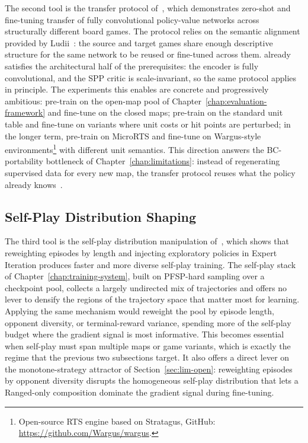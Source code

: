 The second tool is the transfer protocol of~\cite{mellaGeneralTransferApproach}, which demonstrates zero-shot and fine-tuning transfer of fully convolutional policy-value networks across structurally different board games. The protocol relies on the semantic alignment provided by Ludii~\cite{pietteericLudiiLudemicGeneral2020}: the source and target games share enough descriptive structure for the same network to be reused or fine-tuned across them.  already satisfies the architectural half of the prerequisites: the encoder is fully convolutional, and the SPP critic is scale-invariant, so the same protocol applies in principle. The experiments this enables are concrete and progressively ambitious: pre-train on the open-map pool of Chapter~\ref{chap:evaluation-framework} and fine-tune on the closed maps; pre-train on the standard unit table and fine-tune on variants where unit costs or hit points are perturbed; in the longer term, pre-train on MicroRTS and fine-tune on Wargus-style environments\footnote{Open-source RTS engine based on Stratagus, GitHub: \url{https://github.com/Wargus/wargus}.} with different unit semantics. This direction answers the BC-portability bottleneck of Chapter~\ref{chap:limitations}: instead of regenerating supervised data for every new map, the transfer protocol reuses what the policy already knows~\cite{zhuangComprehensiveSurveyTransfer2019}.

\subsection{Self-Play Distribution Shaping}

The third tool is the self-play distribution manipulation of~\cite{soemersManipulatingDistributionsExperience2020}, which shows that reweighting episodes by length and injecting exploratory policies in Expert Iteration produces faster and more diverse self-play training. The self-play stack of Chapter~\ref{chap:training-system}, built on PFSP-hard sampling over a checkpoint pool, collects a largely undirected mix of trajectories and offers no lever to densify the regions of the trajectory space that matter most for learning. Applying the same mechanism would reweight the pool by episode length, opponent diversity, or terminal-reward variance, spending more of the self-play budget where the gradient signal is most informative. This becomes essential when self-play must span multiple maps or game variants, which is exactly the regime that the previous two subsections target. It also offers a direct lever on the monotone-strategy attractor of Section~\ref{sec:lim-open}: reweighting episodes by opponent diversity disrupts the homogeneous self-play distribution that lets a Ranged-only composition dominate the gradient signal during fine-tuning.

